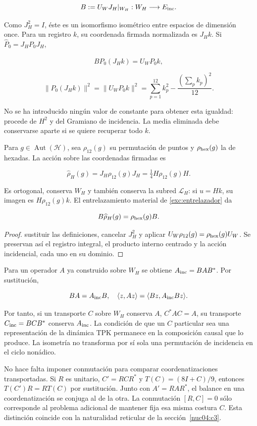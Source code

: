 \[
B:=U_WJ_H|_{W_H}:W_H\longrightarrow E_{\rm inc}.
\]

Como \(J_H^2=I\), éste es un isomorfismo isométrico entre espacios de dimensión once. Para un registro \(k\), su coordenada firmada normalizada es \(J_Hk\). Si \(\widehat P_0=J_HP_0J_H\),

\[
B\widehat P_0(J_Hk)=U_WP_0k,
\]

\[
\|\widehat P_0(J_Hk)\|^2
=\|U_WP_0k\|^2
=\sum_{p=1}^{12}k_p^2-\frac{(\sum_pk_p)^2}{12}.
\]

No se ha introducido ningún valor de constante para obtener esta igualdad: procede de \(H^2\) y del Gramiano de incidencia. La media eliminada debe conservarse aparte si se quiere recuperar todo \(k\).

Para \(g\in\operatorname{Aut}(\mathcal H)\), sea \(\rho_{12}(g)\) su permutación de puntos y \(\rho_{\rm hex}(g)\) la de hexadas. La acción sobre las coordenadas firmadas es

\[
\widehat\rho_H(g)=J_H\rho_{12}(g)J_H
=\tfrac14H\rho_{12}(g)H.
\]

Es ortogonal, conserva \(W_H\) y también conserva la subred \(\mathcal L_H\): si \(u=Hk\), su imagen es \(H\rho_{12}(g)k\). El entrelazamiento material de \cref{exc:entrelazador} da

\[
B\widehat\rho_H(g)=\rho_{\rm hex}(g)B.
\]

\begin{proof}
sustituir las definiciones, cancelar \(J_H^2\) y aplicar \(U_W\rho_{12}(g)=\rho_{\rm hex}(g)U_W\). Se preservan así el registro integral, el producto interno centrado y la acción incidencial, cada uno en su dominio.
\end{proof}

Para un operador \(A\) ya construido sobre \(W_H\) se obtiene \(A_{\rm inc}=BAB^*\). Por sustitución,

\[
BA=A_{\rm inc}B,\quad
\langle z,Az\rangle=\langle Bz,A_{\rm inc}Bz\rangle.
\]

Por tanto, si un transporte \(C\) sobre \(W_H\) conserva \(A\), \(C^*AC=A\), su transporte \(C_{\rm inc}=BCB^*\) conserva \(A_{\rm inc}\). La condición de que un \(C\) particular sea una representación de la dinámica TPK permanece en la composición causal que lo produce. La isometría no transforma por sí sola una permutación de incidencia en el ciclo nonádico.

No hace falta imponer conmutación para comparar coordenatizaciones transportadas. Si \(R\) es unitario, \(C'=RCR^*\) y \(T(C)=(8I+C)/9\), entonces \(T(C')R=RT(C)\) por sustitución. Junto con \(A'=RAR^*\), el balance en una coordenatización se conjuga al de la otra. La conmutación \([R,C]=0\) sólo corresponde al problema adicional de mantener fija esa misma costura \(C\). Esta distinción coincide con la naturalidad reticular de la sección~\ref{nuc04:c3}.

